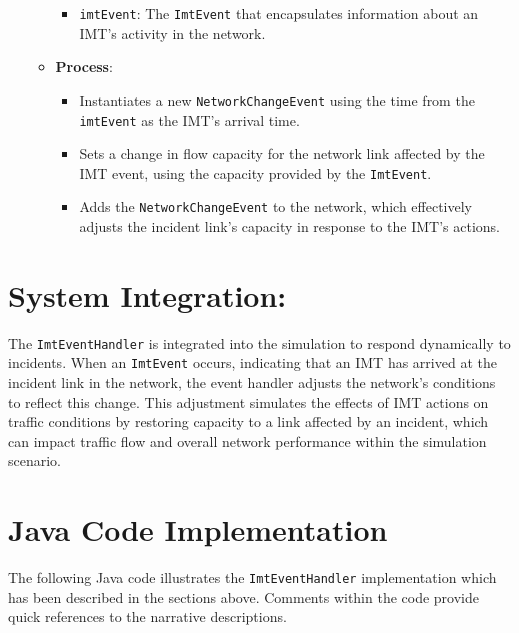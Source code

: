 \documentclass[fancy, oneside, mastersfancy, ms]{byuthesis}
\providecommand{\tightlist}{%
  \setlength{\itemsep}{0pt}\setlength{\parskip}{0pt}}\usepackage{longtable,booktabs,array}
\begin{document}
\begin{itemize}
\begin{itemize}
    \begin{itemize}
    \tightlist
    \item
      \texttt{imtEvent}: The \texttt{ImtEvent} that encapsulates
      information about an IMT's activity in the network.
    \end{itemize}
  \item
    \textbf{Process}:

    \begin{itemize}
    \tightlist
    \item
      Instantiates a new \texttt{NetworkChangeEvent} using the time from
      the \texttt{imtEvent} as the IMT's arrival time.
    \item
      Sets a change in flow capacity for the network link affected by
      the IMT event, using the capacity provided by the
      \texttt{ImtEvent}.
    \item
      Adds the \texttt{NetworkChangeEvent} to the network, which
      effectively adjusts the incident link's capacity in response to
      the IMT's actions.
    \end{itemize}
  \end{itemize}
\end{itemize}

\hypertarget{system-integration}{%
\section{System Integration:}\label{system-integration}}

The \texttt{ImtEventHandler} is integrated into the simulation to
respond dynamically to incidents. When an \texttt{ImtEvent} occurs,
indicating that an IMT has arrived at the incident link in the network,
the event handler adjusts the network's conditions to reflect this
change. This adjustment simulates the effects of IMT actions on traffic
conditions by restoring capacity to a link affected by an incident,
which can impact traffic flow and overall network performance within the
simulation scenario.

\hypertarget{java-code-implementation-1}{%
\section{Java Code Implementation}\label{java-code-implementation-1}}

The following Java code illustrates the \texttt{ImtEventHandler}
implementation which has been described in the sections above. Comments
within the code provide quick references to the narrative descriptions.
\end{document}
